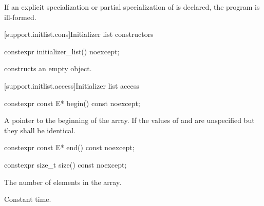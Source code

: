 \pnum
If an explicit specialization or partial specialization of
 is declared, the program is ill-formed.

[support.initlist.cons]{Initializer list constructors}

\begin{itemdecl}
constexpr initializer_list() noexcept;
\end{itemdecl}

\begin{itemdescr}
\pnum
\effects constructs an empty  object.

\pnum
\postcondition {}
\end{itemdescr}

[support.initlist.access]{Initializer list access}

\begin{itemdecl}
constexpr const E* begin() const noexcept;
\end{itemdecl}

\begin{itemdescr}
\pnum
\returns A pointer to the beginning of the array. If  the
values of  and  are unspecified but they shall be
identical.
\end{itemdescr}

\begin{itemdecl}
constexpr const E* end() const noexcept;
\end{itemdecl}

\begin{itemdescr}
\pnum
\returns {}
\end{itemdescr}

\begin{itemdecl}
constexpr size_t size() const noexcept;
\end{itemdecl}

\begin{itemdescr}
\pnum
\returns The number of elements in the array.

\pnum
\complexity Constant time.
\end{itemdescr}

